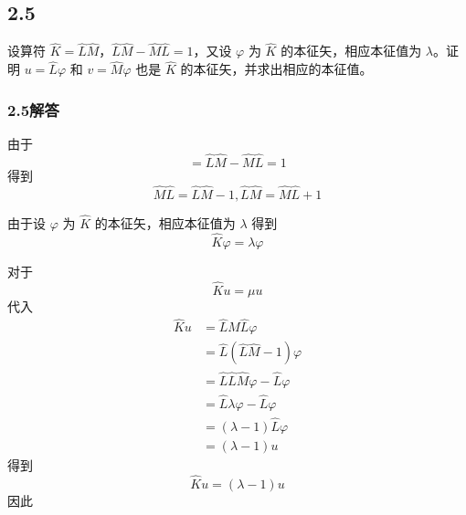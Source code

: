 \newpage
\subsection{2.5}
设算符 $\hat{K} = \hat{L} \hat{M}$，$\hat{L} \hat{M} - \hat{M} \hat{L} = 1$，又设 $\varphi$ 为 $\hat{K}$ 的本征矢，相应本征值为 $\lambda$。证明 $u = \hat{L} \varphi$ 和 $v = \hat{M} \varphi$ 也是 $\hat{K}$ 的本征矢，并求出相应的本征值。

\subsubsection{2.5解答}
由于
\begin{equation}
    [ \hat{L},\hat{M} ] =\hat{L}\hat{M}-\hat{M}\hat{L}=1
\end{equation}
得到
\begin{equation}
    \hat{M}\hat{L}=\hat{L}\hat{M}-1,\hat{L}\hat{M}=\hat{M}\hat{L}+1
\end{equation}

由于设 $\varphi$ 为 $\hat{K}$ 的本征矢，相应本征值为 $\lambda$
得到
\begin{equation}
    \hat{K}\varphi =\lambda \varphi 
\end{equation}

对于
\begin{equation}
    \hat{K}u=\mu u
\end{equation}
代入
\begin{equation}
    \begin{aligned}
        \hat{K}u&=\hat{L}\hat{M}\hat{L}\varphi 
\\
&=\hat{L}\left( \hat{L}\hat{M}-1 \right) \varphi 
\\
&=\hat{L}\hat{L}\hat{M}\varphi -\hat{L}\varphi 
\\
&=\hat{L}\lambda \varphi -\hat{L}\varphi 
\\
&=\left( \lambda -1 \right) \hat{L}\varphi 
\\
&=\left( \lambda -1 \right) u
    \end{aligned}
\end{equation}
得到
\begin{equation}
    \hat{K}u=\left( \lambda -1 \right) u
\end{equation}
因此

